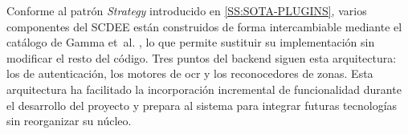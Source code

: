 Conforme al patrón \textit{Strategy} introducido en
\cref{SS:SOTA-PLUGINS}, varios componentes del SCDEE están construidos
de forma intercambiable mediante el catálogo de Gamma et~al.
\cite{gof1994designpatterns}, lo que permite sustituir su implementación
sin modificar el resto del código. Tres puntos del backend
siguen esta arquitectura: los  de autenticación, los motores
de \acs{ocr} y los reconocedores de zonas. Esta arquitectura ha facilitado
la incorporación incremental de funcionalidad durante el desarrollo del
proyecto y prepara al sistema para integrar futuras tecnologías sin
reorganizar su núcleo.
